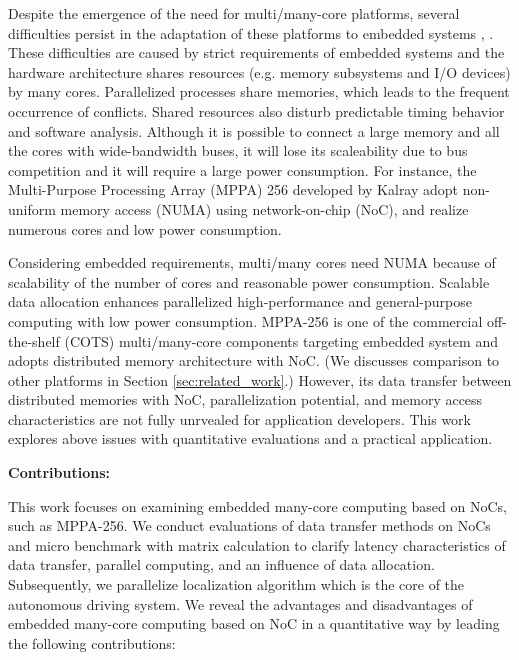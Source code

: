 \documentclass[conference,compsoc]{IEEEtran}
\newcommand{\comment}[1]{}
\begin{document}
Despite the emergence of the need for multi/many-core platforms, several difficulties persist in the adaptation of these platforms to embedded systems \cite{becker2016contention}, \cite{saidi2015shift}.
These difficulties are caused by strict requirements of embedded systems and the hardware architecture shares resources (e.g. memory subsystems and I/O devices) by many cores.
Parallelized processes share memories, which leads to the frequent occurrence of conflicts.
Shared resources also disturb predictable timing behavior and software analysis.
Although it is possible to connect a large memory and all the cores with wide-bandwidth buses, it will lose its scaleability due to bus competition and it will require a large power consumption.
For instance, the Multi-Purpose Processing Array (MPPA) 256 developed by Kalray \cite{de2014time} adopt non-uniform memory access (NUMA) using network-on-chip (NoC), and realize numerous cores and low power consumption.

Considering embedded requirements, multi/many cores need NUMA because of scalability of the number of cores and reasonable power consumption.
Scalable data allocation enhances parallelized high-performance and general-purpose computing with low power consumption.
MPPA-256 is one of the commercial off-the-shelf (COTS) multi/many-core components targeting embedded system and adopts distributed memory architecture with NoC. (We discusses comparison to other platforms in Section \ref{sec:related_work}.)
However, its data transfer between distributed memories with NoC, parallelization potential, and memory access characteristics are not fully unrvealed for application developers.
This work explores above issues with quantitative evaluations and a practical application.

\textbf{Contributions:}
\comment{1-1, 3-3: To be clarified}
This work focuses on examining embedded many-core computing based on NoCs, such as MPPA-256.
We conduct evaluations of data transfer methods on NoCs and micro benchmark with matrix calculation to clarify latency characteristics of data transfer, parallel computing, and an influence of data allocation.
Subsequently, we parallelize localization algorithm which is the core of the autonomous driving system.
We reveal the advantages and disadvantages of embedded many-core computing based on NoC in a quantitative way by leading the following contributions:
\end{document}
